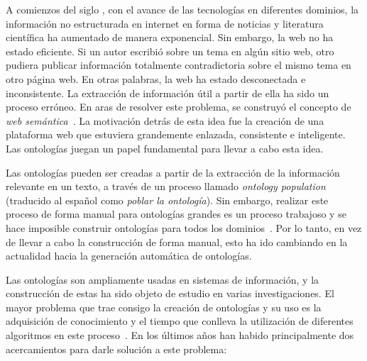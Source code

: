 \label{chapter:automatic_generation_of_ontologies}

A comienzos del siglo , con el avance de las tecnologías en diferentes dominios, la información no estructurada en internet en forma de noticias y literatura científica ha aumentado de manera exponencial. Sin embargo, la web no ha estado eficiente. Si un autor escribió sobre un tema en algún sitio web, otro pudiera publicar información totalmente contradictoria sobre el mismo tema en otro página web. En otras palabras, la web ha estado desconectada e inconsistente. La extracción de información útil a partir de ella ha sido un proceso erróneo. En aras de resolver este problema, se construyó el concepto de \textit{web semántica}~\cite{ref:35}. La motivación detrás de esta idea fue la creación de una plataforma web que estuviera grandemente enlazada, consistente e inteligente. Las ontologías juegan un papel fundamental para llevar a cabo esta idea.

Las ontologías pueden ser creadas a partir de la extracción de la información relevante en un texto, a través de un proceso llamado \textit{ontology population} (traducido al español como \textit{poblar la ontología}). Sin embargo, realizar este proceso de forma manual para ontologías grandes es un proceso trabajoso y se hace imposible construir ontologías para todos los dominios~\cite{ref:36}. Por lo tanto, en vez de llevar a cabo la construcción de forma manual, esto ha ido cambiando en la actualidad hacia la generación automática de ontologías.

Las ontologías son ampliamente usadas en sistemas de información, y la construcción de estas ha sido objeto de estudio en varias investigaciones. El mayor problema que trae consigo la creación de ontologías y su uso es la adquisición de conocimiento y el tiempo que conlleva la utilización de diferentes algoritmos en este proceso~\cite{ref:37}. En los últimos años han habido principalmente dos acercamientos para darle solución a este problema:


